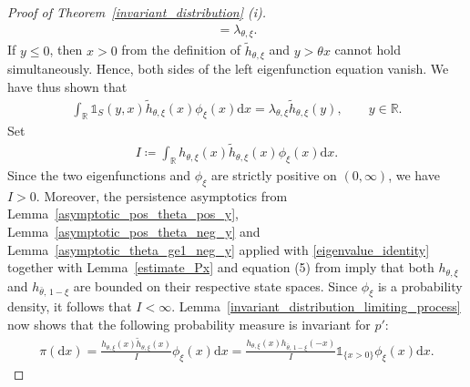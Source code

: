 \documentclass[12pt]{article}
\newcommand{\R}{\mathbb{R}} %
\newcommand{\1}{\mathds{1}}
\renewcommand{\d}{\mathrm{d}}
\theoremstyle{definition}
\theoremstyle{plain}
\theoremstyle{remark}
\begin{document}
\begin{proof}[Proof of Theorem~\ref{invariant_distribution} (i)]
\begin{align}
    = \lambda_{\theta,\xi}. \label{eigenvalue_identity}
\end{align} 
If $y\leq0$, then $x>0$ from the definition of $\tilde h_{\theta,\xi}$ and $y>\theta x$ cannot hold simultaneously. Hence, both sides of the left eigenfunction equation vanish. We have thus shown that 
\begin{align*} 
    \int_\R \mathds{1}_S(y,x) \tilde h_{\theta,\xi}(x) \phi_\xi( x)\d x = \lambda_{\theta,\xi} \tilde h_{\theta,\xi}(y), \qquad y\in\R. 
\end{align*} 
Set 
\begin{align*} 
    I  \coloneqq \int_\R h_{\theta,\xi}(x) \tilde h_{\theta,\xi}(x) \phi_\xi( x)\d x. 
\end{align*}
Since the two eigenfunctions and $\phi_\xi$ are strictly positive on $(0,\infty)$, we have $I >0$. Moreover, the persistence asymptotics from Lemma~\ref{asymptotic_pos_theta_pos_y}, Lemma~\ref{asymptotic_pos_theta_neg_y} and Lemma~\ref{asymptotic_theta_ge1_neg_y} applied with \eqref{eigenvalue_identity} together with Lemma~\ref{estimate_Px} and equation (5) from \cite{AR} imply that both $h_{\theta,\xi}$ and $h_{\bar\theta,\,1-\xi}$ are bounded on their respective state spaces. Since $\phi_\xi$ is a probability density, it follows that $I <\infty$.
Lemma~\ref{invariant_distribution_limiting_process} now shows that the following probability measure is invariant for $p'$:
\begin{align*} 
    \pi (\d x) 
    = \frac{ h_{\theta,\xi}(x) \tilde h_{\theta,\xi}(x) }{ I  } \phi_\xi( x)\d x 
    = \frac{ h_{\theta,\xi}(x) h_{\bar\theta,\,1-\xi}(-x) }{ I  } \mathds{1}_{\{x>0\}} \phi_\xi( x)\d x.
\end{align*} 
 


\end{proof}
\end{document}
